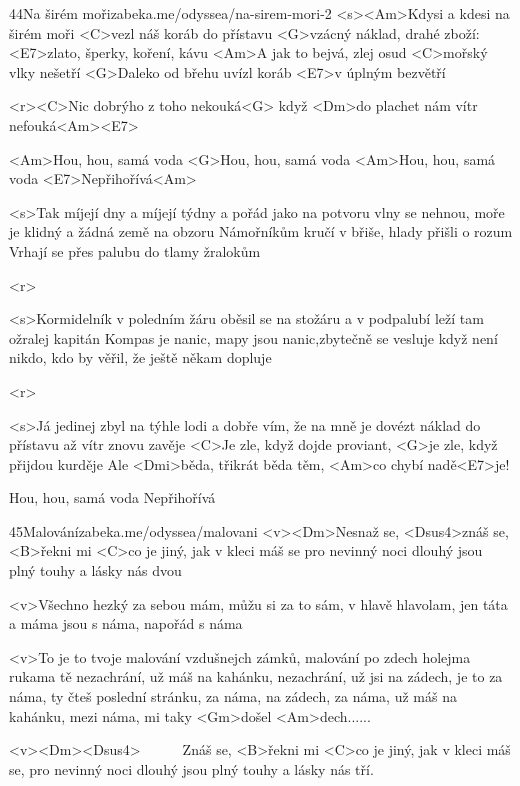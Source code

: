 \begin{song}[Traband]{44}{Na širém moři}{zabeka.me/odyssea/na-sirem-mori-2}
	<s><Am>Kdysi a kdesi na širém moři <C>vezl náš koráb do přístavu
	<G>vzácný náklad, drahé zboží: <E7>zlato, šperky, koření, kávu
	<Am>A jak to bejvá, zlej osud <C>mořský vlky nešetří
	<G>Daleko od břehu uvízl koráb <E7>v úplným bezvětří

	<r><C>Nic dobrýho z toho nekouká<G>
	když <Dm>do plachet nám vítr nefouká<Am><E7>

	<Am>Hou, hou, samá voda
	<G>Hou, hou, samá voda
	<Am>Hou, hou, samá voda
	<E7>Nepřihořívá<Am>

	<s>Tak míjejí dny a míjejí týdny a pořád jako na potvoru
	vlny se nehnou, moře je klidný a žádná země na obzoru
	Námořníkům kručí v břiše, hlady přišli o rozum
	Vrhají se přes palubu do tlamy žralokům

	<r>

	<s>Kormidelník v poledním žáru oběsil se na stožáru
	a v podpalubí leží tam ožralej kapitán
	Kompas je nanic, mapy jsou nanic,zbytečně se vesluje
	když není nikdo, kdo by věřil, že ještě někam dopluje

	<r>

	<s>Já jedinej zbyl na týhle lodi a dobře vím, že na mně je
	dovézt náklad do přístavu až vítr znovu zavěje
	<C>Je zle, když dojde proviant, <G>je zle, když přijdou kurděje
	Ale <Dmi>běda, třikrát běda těm, <Am>co chybí nadě<E7>je!

	Hou, hou, samá voda
	Nepřihořívá

\end{song}
\begin{song}{45}{Malování}{zabeka.me/odyssea/malovani}
	<v><Dm>Nesnaž se, <Dsus4>znáš se, <B>řekni mi <C>co je jiný,
	jak v kleci máš se pro nevinný
	noci dlouhý jsou plný touhy a lásky nás dvou 

	<v>Všechno hezký za sebou mám, můžu si za to sám, v hlavě hlavolam,
	jen táta a máma jsou s náma, napořád s náma

	<v>To je to tvoje malování vzdušnejch zámků,
	malování po zdech holejma rukama
	tě nezachrání, už máš na kahánku,
	nezachrání, už jsi na zádech,
	je to za náma, ty čteš poslední stránku, za náma, na zádech, za náma,
	už máš na kahánku, mezi náma, mi taky <Gm>došel <Am>dech......

	<v><Dm><Dsus4>\ \ \ \ \ \ Znáš se, <B>řekni mi <C>co je jiný,
	jak v kleci máš se, pro nevinný
	noci dlouhý jsou plný touhy a lásky nás tří.

\end{song}
